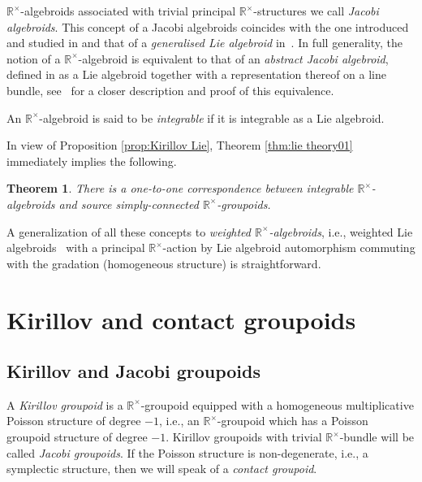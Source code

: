 \documentclass[pdftex]{sigma}
\newcommand{\R}{{\mathbb R}}
\newcommand{\ti}{\times}
\def\Rt{{\R^\times}}
\numberwithin{equation}{section}
\newtheorem{Theorem}{Theorem}[section]
\begin{document}
\begin{Remark}
$\Rt$-algebroids associated with trivial principal $\Rt$-structures we call \emph{Jacobi algebroids}. This concept of a Jacobi algebroids coincides with the one introduced and studied in \cite{Grabowski:2001,Grabowski:2003} and that of a \emph{generalised Lie algebroid} in~\cite{Iglesias-Ponte:2001}. In full generality, the notion of a $\Rt$-algebroid is equivalent to that of an \emph{abstract Jacobi algebroid}, def\/ined in \cite{Le:2014} as a Lie algebroid together with a representation thereof on a line bundle, see~\cite{Grabowski2013} for a closer description and proof of this equivalence.
\end{Remark}

\begin{Definition}
An $\Rt$-algebroid is said to be \emph{integrable} if it is integrable as a Lie algebroid.
\end{Definition}

In view of Proposition \ref{prop:Kirillov Lie}, Theorem \ref{thm:lie theory01} immediately implies the following.
\begin{Theorem}\label{thm:lie theory1} There is a one-to-one correspondence between integrable $\Rt$-algebroids and source simply-connected $\mathbb{R}^{\times}$-groupoids.
\end{Theorem}

A generalization of all these concepts to \emph{weighted $\Rt$-algebroids}, i.e., weighted Lie algebroids~\cite{Bruce:2014} with a principal $\Rt$-action by Lie algebroid automorphism commuting with the gradation (homogeneous structure) is straightforward.

\section{Kirillov and contact groupoids}\label{sec:contact and jacobi}
\subsection{Kirillov and Jacobi groupoids}
\begin{Definition}A \emph{Kirillov groupoid} is a $\mathbb{R}^{\times}$-groupoid equipped with a homogeneous multiplicative Poisson structure of degree $-1$, i.e., an $\Rt$-groupoid which has a Poisson groupoid structure of degree $-1$. Kirillov groupoids with trivial $\R^\ti$-bundle will be called \emph{Jacobi groupoids}. If the Poisson structure is non-degenerate, i.e., a symplectic structure, then we will speak of a \emph{contact groupoid}.
\end{Definition}
\end{document}

